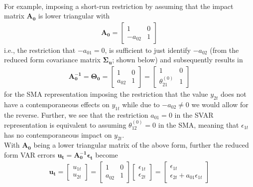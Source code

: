 \documentclass[a4paper,11pt,listof=nochaptergap,oneside,pointednumbers,bibtotoc,bigheadings,liststotoc]{scrbook}
\newcommand{\vect}[1]{\boldsymbol{\mathbf{#1}}}
\begin{document}
\\
For example, imposing a short-run restriction by assuming that the impact matrix $\vect{A_0}$ is lower triangular with
\begin{equation} \label{eq:svar11}
\begin{split}
 		\vect{A_0} = 	\begin{bmatrix}
    					1 & 0 \\
					-a_{02} & 1
 					\end{bmatrix}
\end{split}								
\end{equation}
i.e., the restriction that $-a_{01}=0$, is sufficient to just identify $-a_{02}$ (from the reduced form covariance matrix $\vect{\Sigma_u}$; shown below) and subsequently results in 
\begin{equation} \label{eq:svar12}
\begin{split}
 		\vect{A_0^{-1}} = \vect{\Theta_0} = 	
					\begin{bmatrix}
    					1 & 0 \\
					a_{02} & 1
 					\end{bmatrix} = 
						\begin{bmatrix}
    						1 & 0 \\
						\theta_{21}^{(0)} & 1
 						\end{bmatrix}
\end{split}								
\end{equation}
for the SMA representation imposing the restriction that the value $y_{2t}$ does not have a contemporaneous effects on $y_{1t}$ while due to $-a_{02} \neq 0$ we would allow for the reverse. Further, we see that the restriction $a_{01}=0$ in the SVAR representation is equivalent to assuming $\theta_{12}^{(0)}=0$ in the SMA, meaning that $\epsilon_{1t}$ has no contemporaneous impact on $y_{2t}$.\\
With $\vect{A_0}$ being a lower triangular matrix of the above form, further the reduced form VAR errors $\vect{u_t} = \vect{A_0^{-1}}\vect{\epsilon_t}$ become
\begin{equation} \label{eq:svar13}
\begin{split}
 		\vect{u_t} = \begin{bmatrix}
    					u_{1t} \\
					u_{2t} 
 					\end{bmatrix} = 
						\begin{bmatrix}
    						1 & 0 \\
						a_{02} & 1  
 						\end{bmatrix} 
							\begin{bmatrix}
    							\epsilon_{1t} \\
							\epsilon_{2t} 
 							\end{bmatrix} = 
								\begin{bmatrix}
    								\epsilon_{1t} \\
								\epsilon_{2t}+a_{01}\epsilon_{1t} 
 								\end{bmatrix} 			
\end{split}								
\end{equation}
\end{document}
